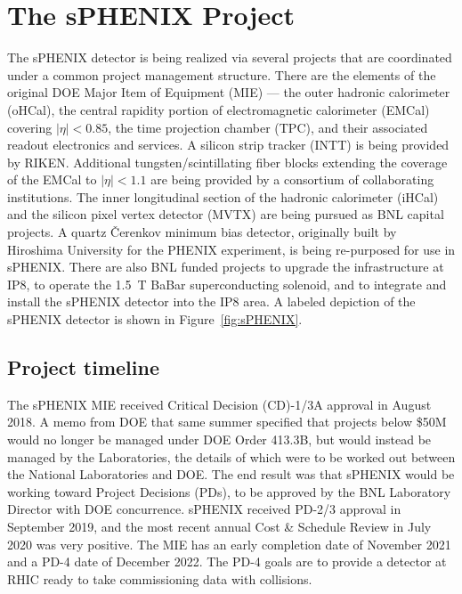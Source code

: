 \chapter{The sPHENIX Project}
\label{chap:project}

The sPHENIX detector is being realized via several projects that are
coordinated under a common project management structure.  There are
the elements of the original DOE Major Item of Equipment (MIE) --- the outer hadronic calorimeter (oHCal), the
central rapidity portion of electromagnetic calorimeter (EMCal)
covering $|\eta| < 0.85$, the time projection chamber (TPC), and their
associated readout electronics and services.  A silicon strip tracker
(INTT) is being provided by RIKEN.  Additional tungsten/scintillating
fiber blocks extending the coverage of the EMCal to $|\eta| < 1.1$ are
being provided by a consortium of collaborating institutions.
The inner longitudinal section of the hadronic calorimeter (iHCal) and
the silicon pixel vertex detector (MVTX) are being pursued as BNL
capital projects.  A quartz \v{C}erenkov minimum bias detector,
originally built by Hiroshima University for the PHENIX experiment, is
being re-purposed for use in sPHENIX.  There are also BNL funded
projects to upgrade the infrastructure at IP8, to operate the 1.5~T BaBar
superconducting solenoid, and to integrate and
install the sPHENIX detector into the IP8 area.  A labeled depiction of the
sPHENIX detector is shown in Figure~\ref{fig:sPHENIX}.

\section{Project timeline}
\label{sec:timeline}

The sPHENIX MIE received Critical Decision (CD)-1/3A approval in August 2018.  A memo from
DOE that same summer specified that projects below \$50M would no
longer be managed under DOE Order 413.3B, but would instead be managed
by the Laboratories, the details of which were to be worked out
between the National Laboratories and DOE.  The end result was that
sPHENIX would be working toward Project Decisions (PDs), to be
approved by the BNL Laboratory Director with DOE concurrence.  sPHENIX
received PD-2/3 approval in September 2019, and the most recent annual Cost \& Schedule Review in July 2020 was very positive.  The MIE has an early
completion date of November 2021 and a PD-4 date of December 2022.
The PD-4 goals are to provide a detector at RHIC ready to take 
commissioning data with collisions.

